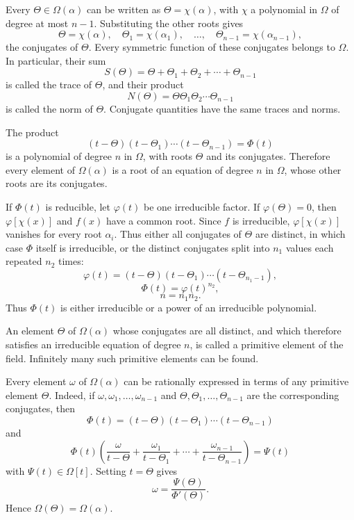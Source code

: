 \documentclass[11pt]{article}
\begin{document}
Every $\Theta\in\Omega(\alpha)$ can be written as $\Theta=\chi(\alpha)$, with $\chi$ a polynomial in $\Omega$ of degree at most $n-1$. Substituting the other roots gives
\[
\tag{6}
        \Theta=\chi(\alpha),\quad
        \Theta_1=\chi(\alpha_1),\quad\ldots,\quad
        \Theta_{n-1}=\chi(\alpha_{n-1}),
\]
the conjugates of $\Theta$. Every symmetric function of these conjugates belongs to $\Omega$. In particular, their sum
\[
\tag{7}
        S(\Theta)=\Theta+\Theta_1+\Theta_2+\cdots+\Theta_{n-1}
\]
is called the trace of $\Theta$, and their product
\[
\tag{8}
        N(\Theta)=\Theta\Theta_1\Theta_2\cdots\Theta_{n-1}
\]
is called the norm of $\Theta$. Conjugate quantities have the same traces and norms.

The product
\[
\tag{9}
        (t-\Theta)(t-\Theta_1)\cdots(t-\Theta_{n-1})=\Phi(t)
\]
is a polynomial of degree $n$ in $\Omega$, with roots $\Theta$ and its conjugates. Therefore every element of $\Omega(\alpha)$ is a root of an equation of degree $n$ in $\Omega$, whose other roots are its conjugates.

If $\Phi(t)$ is reducible, let $\varphi(t)$ be one irreducible factor. If $\varphi(\Theta)=0$, then $\varphi[\chi(x)]$ and $f(x)$ have a common root. Since $f$ is irreducible, $\varphi[\chi(x)]$ vanishes for every root $\alpha_i$. Thus either all conjugates of $\Theta$ are distinct, in which case $\Phi$ itself is irreducible, or the distinct conjugates split into $n_1$ values each repeated $n_2$ times:
\[
\tag{10}
        \varphi(t)=(t-\Theta)(t-\Theta_1)\cdots(t-\Theta_{n_1-1}),
\]
\[
\tag{11}
        \Phi(t)=\varphi(t)^{n_2},
\]
\[
\tag{12}
        n=n_1n_2.
\]
Thus $\Phi(t)$ is either irreducible or a power of an irreducible polynomial.

An element $\Theta$ of $\Omega(\alpha)$ whose conjugates are all distinct, and which therefore satisfies an irreducible equation of degree $n$, is called a primitive element of the field. Infinitely many such primitive elements can be found.

Every element $\omega$ of $\Omega(\alpha)$ can be rationally expressed in terms of any primitive element $\Theta$. Indeed, if $\omega,\omega_1,\ldots,\omega_{n-1}$ and $\Theta,\Theta_1,\ldots,\Theta_{n-1}$ are the corresponding conjugates, then
\[
        \Phi(t)=(t-\Theta)(t-\Theta_1)\cdots(t-\Theta_{n-1})
\]
and
\[
        \Phi(t)\left(
        \frac{\omega}{t-\Theta}+
        \frac{\omega_1}{t-\Theta_1}+\cdots+
        \frac{\omega_{n-1}}{t-\Theta_{n-1}}
        \right)=\Psi(t)
\]
with $\Psi(t)\in\Omega[t]$. Setting $t=\Theta$ gives
\[
        \omega=\frac{\Psi(\Theta)}{\Phi'(\Theta)}.
\]
Hence $\Omega(\Theta)=\Omega(\alpha)$.
\end{document}
